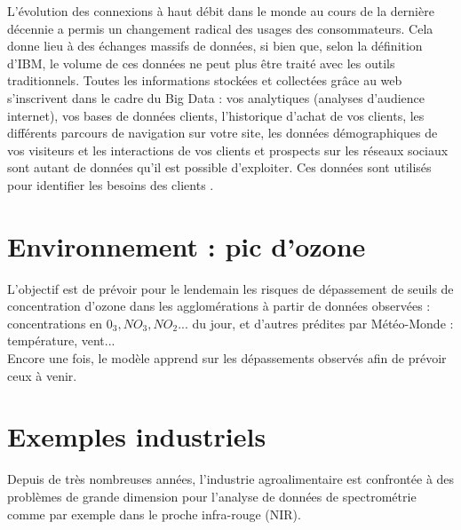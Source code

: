 \documentclass[11pt,twoside,openany,x11names,svgnames]{memoir}
\begin{document}
\begin{itemize}
						\normalsize L’évolution des connexions à haut débit dans le monde au cours de la dernière décennie a permis un changement radical des usages des consommateurs.  Cela donne lieu à des échanges massifs de données, si bien que, selon la définition d’IBM, le volume de ces données ne peut plus être traité avec les outils traditionnels. 
Toutes les informations stockées et collectées grâce au web s’inscrivent dans le cadre du Big Data : vos analytiques (analyses d’audience internet), vos bases de données clients, l’historique d’achat de vos clients, les différents parcours de navigation sur votre site, les données démographiques de vos visiteurs et les interactions de vos clients et prospects sur les réseaux sociaux sont autant de données qu’il est possible d’exploiter.
Ces données sont utilisés pour identifier les besoins des clients .

\section{Environnement : pic d’ozone}

L’objectif est de prévoir pour le lendemain les risques de dépassement de seuils de concentration d’ozone dans les agglomérations à partir de données observées : concentrations en $0_{3}, NO_{3}, NO_{2}$... du jour, et d’autres prédites par Météo-Monde : température, vent... \\ Encore une fois, le modèle apprend sur les dépassements observés afin de prévoir ceux à venir.

\section{Exemples industriels}


Depuis de très nombreuses années, l’industrie agroalimentaire est confrontée à des problèmes de grande dimension pour l’analyse de données de spectrométrie comme par exemple dans le proche infra-rouge (NIR).


\end{itemize}
\end{document}
